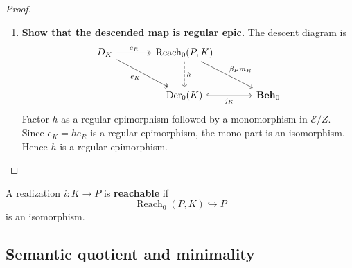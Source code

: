 \begin{proof}
\begin{enumerate}
        \item \textbf{Show that the descended map is regular epic.} The descent diagram is
        \[
            \begin{tikzcd}[column sep=large, row sep=large]
                    {D_K}
                        \arrow[r, two heads, "{e_R}"]
                        \arrow[dr, two heads, "{e_K}"']
                &
                    {\operatorname{Reach}_0(P,K)}
                        \arrow[d, dashed, "{h}"]
                        \arrow[dr, "{\beta_P m_R}"]
                &
                \\
                &
                    {\operatorname{Der}_0(K)}
                        \arrow[r, hook, "{j_K}"']
                &
                    {\mathbf{Beh}_0}
            \end{tikzcd}
        \]
        Factor \(h\) as a regular epimorphism followed by a monomorphism in \(\mathcal E/Z\). Since \(e_K=he_R\) is a regular epimorphism, the mono part is an isomorphism. Hence \(h\) is a regular epimorphism.
    \end{enumerate}
\end{proof}

\begin{definition}
\label{def:reachable-realization}
    A realization \(i:K\to P\) is \textbf{reachable} if
    \[
        \operatorname{Reach}_0(P,K)\hookrightarrow P
    \]
    is an isomorphism.
\end{definition}

\subsection{Semantic quotient and minimality}
\label{subsec:semantic-quotient-minimality}


